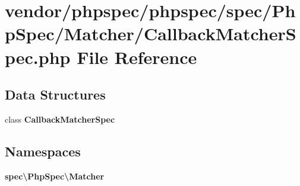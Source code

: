 \section{vendor/phpspec/phpspec/spec/\+Php\+Spec/\+Matcher/\+Callback\+Matcher\+Spec.php File Reference}
\label{_callback_matcher_spec_8php}
\subsection*{Data Structures}
\begin{DoxyCompactItemize}
\item 
class {\bf Callback\+Matcher\+Spec}
\end{DoxyCompactItemize}
\subsection*{Namespaces}
\begin{DoxyCompactItemize}
\item 
 {\bf spec\textbackslash{}\+Php\+Spec\textbackslash{}\+Matcher}
\end{DoxyCompactItemize}
